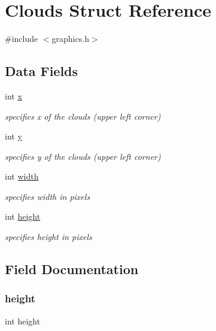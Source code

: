 \hypertarget{struct_clouds}{}\section{Clouds Struct Reference}
\label{struct_clouds}


{\ttfamily \#include $<$graphics.\+h$>$}

\subsection*{Data Fields}
\begin{DoxyCompactItemize}
\item 
int \hyperlink{struct_clouds_a6150e0515f7202e2fb518f7206ed97dc}{x}
\begin{DoxyCompactList}\small\item\em specifies x of the clouds (upper left corner) \end{DoxyCompactList}\item 
int \hyperlink{struct_clouds_a0a2f84ed7838f07779ae24c5a9086d33}{y}
\begin{DoxyCompactList}\small\item\em specifies y of the clouds (upper left corner) \end{DoxyCompactList}\item 
int \hyperlink{struct_clouds_a2474a5474cbff19523a51eb1de01cda4}{width}
\begin{DoxyCompactList}\small\item\em specifies width in pixels \end{DoxyCompactList}\item 
int \hyperlink{struct_clouds_ad12fc34ce789bce6c8a05d8a17138534}{height}
\begin{DoxyCompactList}\small\item\em specifies height in pixels \end{DoxyCompactList}\end{DoxyCompactItemize}


\subsection{Field Documentation}
\mbox{\label{struct_clouds_ad12fc34ce789bce6c8a05d8a17138534}} 
\subsubsection{\texorpdfstring{height}{height}}
{\footnotesize\ttfamily int height}



